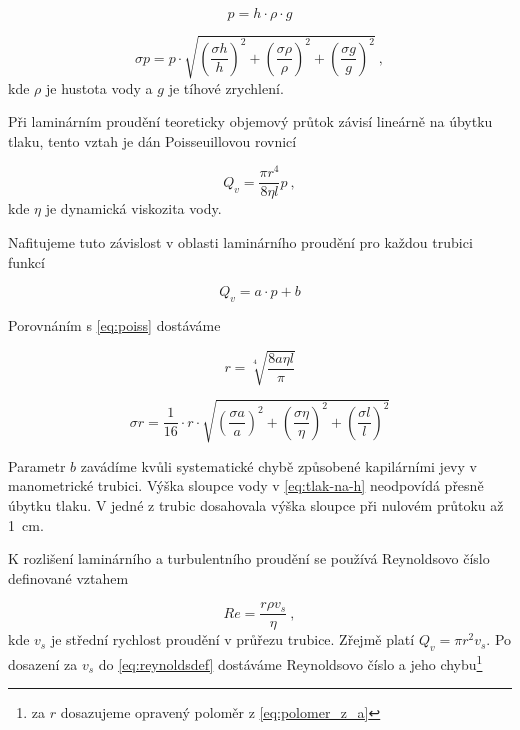 \begin{equation} \label{eq:tlak-na-h}
p=h\cdot \rho \cdot g
\end{equation}


\begin{equation} \label{eq:chybatlak}
\sigma p = p \cdot \sqrt{      \left(\frac{\sigma h}{h} \right)^2+        \left(\frac{\sigma \rho}{\rho}\right)^2   +   \left(\frac{\sigma g}{g}\right)^2}~,
\end{equation}
kde $\rho$ je hustota vody a $g$ je tíhové zrychlení.


Při laminárním proudění teoreticky objemový průtok závisí lineárně na úbytku tlaku, tento vztah je dán  \mbox{Poisseuillovou} rovnicí\cite{ZFP}

\begin{equation} \label{eq:poiss}
Q_v=\frac{\pi r^4}{8 \eta l} p~,
\end{equation}
kde $\eta$ je dynamická viskozita vody.

Nafitujeme tuto závislost v oblasti laminárního proudění pro každou trubici funkcí

\begin{equation} \label{eq:fit}
Q_v = a\cdot p + b
\end{equation}

Porovnáním s \eqref{eq:poiss} dostáváme

\begin{equation} \label{eq:polomer_z_a}
r=\sqrt[ 4]{\frac{8 a \eta l}{\pi}}
\end{equation}

\begin{equation}
\sigma r = \frac{1}{16} \cdot r \cdot \sqrt{      \left(\frac{\sigma a}{a} \right)^2+        \left(\frac{\sigma \eta}{\eta}\right)^2   +   \left(\frac{\sigma l}{l}\right)^2}
\end{equation}

Parametr $b$ zavádíme kvůli systematické chybě způsobené kapilárními jevy v manometrické trubici. Výška sloupce vody v \eqref{eq:tlak-na-h} neodpovídá přesně úbytku tlaku. V jedné z trubic dosahovala výška sloupce při nulovém průtoku až 1~cm.



K rozlišení laminárního a turbulentního proudění se používá Reynoldsovo číslo definované vztahem\cite{ZFP}

\begin{equation} \label{eq:reynoldsdef}
Re=\frac{r \rho v_s}{\eta}~,
\end{equation}
kde $v_s$ je střední rychlost proudění v průřezu trubice. Zřejmě platí $Q_v=\pi r^2 v_s$. Po dosazení za $v_s$ do \eqref{eq:reynoldsdef} dostáváme Reynoldsovo číslo a jeho chybu\footnote{za $r$ dosazujeme opravený poloměr z \eqref{eq:polomer_z_a}}

